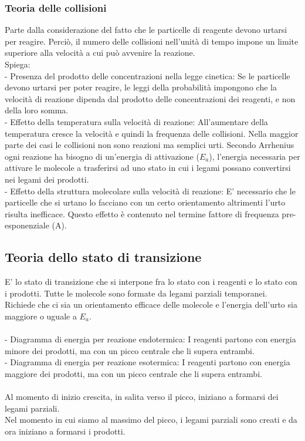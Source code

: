 \subsubsection{Teoria delle collisioni}
Parte dalla considerazione del fatto che le particelle di reagente devono urtarsi per reagire. Perciò, il numero delle collisioni nell'unità di tempo impone un limite superiore alla velocità a cui può avvenire la reazione.\\
Spiega:\\
\tab- Presenza del prodotto delle concentrazioni nella legge cinetica: Se le particelle devono urtarsi per poter reagire, le leggi della probabilità impongono che la velocità di reazione dipenda dal prodotto delle concentrazioni dei reagenti, e non della loro somma.\\
\tab- Effetto della temperatura sulla velocità di reazione: All'aumentare della temperatura cresce la velocità e quindi la frequenza delle collisioni. Nella maggior parte dei casi le collisioni non sono reazioni ma semplici urti. Secondo Arrhenius ogni reazione ha bisogno di un'energia di attivazione ($E_a$), l'energia necessaria per attivare le molecole a trasferirsi ad uno stato in cui i legami possano convertirsi nei legami dei prodotti.\\
\tab- Effetto della struttura molecolare sulla velocità di reazione: E' necessario che le particelle che si urtano lo facciano con un certo orientamento altrimenti l'urto risulta inefficace. Questo effetto è contenuto nel termine fattore di frequenza pre-esponenziale (A).
\subsection{Teoria dello stato di transizione}
E' lo stato di transizione che si interpone fra lo stato con i reagenti e lo stato con i prodotti. Tutte le molecole sono formate da legami parziali temporanei. Richiede che ci sia un orientamento efficace delle molecole e l'energia dell'urto sia maggiore o uguale a $E_a$.\\\\
\tab- Diagramma di energia per reazione endotermica: I reagenti partono con energia minore dei prodotti, ma con un picco centrale che li supera entrambi.\\
\tab- Diagramma di energia per reazione esotermica: I reagenti partono con energia maggiore dei prodotti, ma con un picco centrale che li supera entrambi.\\\\
Al momento di inizio crescita, in salita verso il picco, iniziano a formarsi dei legami parziali.\\
Nel momento in cui siamo al massimo del picco, i legami parziali sono creati e da ora iniziano a formarsi i prodotti.\\
